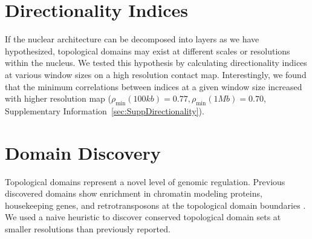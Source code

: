 \section*{Directionality Indices}

If the nuclear architecture can be decomposed into layers as we have hypothesized, topological domains may exist at different
scales or resolutions within the nucleus.  We tested this hypothesis by calculating directionality indices at various window sizes
on a high resolution contact map.  Interestingly, we found that the minimum correlations between indices at a given window size increased
with higher resolution map ($\rho_{\min}(100kb) = 0.77, \rho_{\min}(1Mb) = 0.70$, Supplementary Information~\ref{sec:SuppDirectionality}).

\section*{Domain Discovery}

Topological domains represent a novel level of genomic regulation.  Previous discovered domains show enrichment in chromatin modeling proteins,
housekeeping genes, and retrotransposons at the topological domain boundaries \citep{dixon2012}.  We used a naive heuristic to discover conserved
topological domain sets at smaller resolutions than previously reported.

